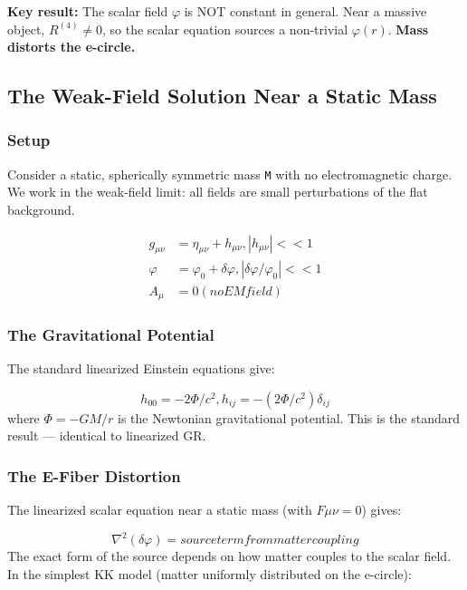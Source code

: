 \documentclass[aps,prd,preprint,superscriptaddress,longbibliography,floatfix]{revtex4-2}
\theoremstyle{remark}
\begin{document}
\textbf{Key result:} The scalar field $\varphi$ is NOT constant in general. Near a massive object, $R^{(4)} \neq 0$, so the scalar equation sources a non-trivial $\varphi(r)$. \textbf{Mass distorts the e-circle.}



\subsection{The Weak-Field Solution Near a Static Mass}


\subsubsection{Setup}

Consider a static, spherically symmetric mass \texttt{M} with no electromagnetic charge. We work in the weak-field limit: all fields are small perturbations of the flat background.


\begin{align}
    g_{\mu\nu} &= \eta_{\mu\nu} + h_{\mu\nu},     |h_{\mu\nu}| << 1 \\
    \varphi &= \varphi_{0} + \delta\varphi,         |\delta\varphi/\varphi_{0}| << 1 \\
    A_{\mu} &= 0              (no EM field)
\end{align}

\subsubsection{The Gravitational Potential}

The standard linearized Einstein equations give:


\begin{equation}
    h_{00} = -2\Phi/c^{2},     h_{ij} = -(2\Phi/c^{2})\delta_{ij}
\end{equation}
where $\Phi = -GM/r$ is the Newtonian gravitational potential. This is the standard result --- identical to linearized GR.


\subsubsection{The E-Fiber Distortion}

The linearized scalar equation near a static mass (with $F\mu\nu = 0$) gives:


\begin{equation}
    \nabla^{2}(\delta\varphi) = source term from matter coupling
\end{equation}
The exact form of the source depends on how matter couples to the scalar field. In the simplest KK model (matter uniformly distributed on the e-circle):
\end{document}
